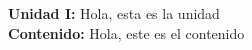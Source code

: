 {\Large
    \textbf{Unidad I:} Hola, esta es la unidad\vspace{2mm}\\
    \textbf{Contenido:} Hola, este es el contenido
}